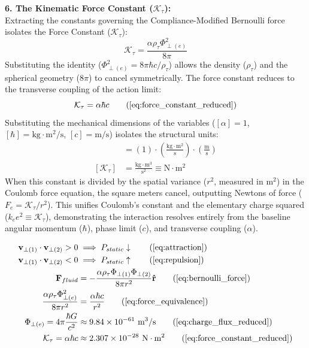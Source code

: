 \textbf{6. The Kinematic Force Constant ($\mathcal{K}_\tau$):} \\
Extracting the constants governing the Compliance-Modified Bernoulli force isolates the Force Constant ($\mathcal{K}_\tau$):
\begin{equation}
    \mathcal{K}_\tau = \frac{\alpha \rho_{\tau} \Phi_{\perp(e)}^2}{8\pi}
\end{equation}
Substituting the identity ($\Phi_{\perp(e)}^2 = 8\pi \hbar c / \rho_{\tau}$) allows the density ($\rho_{\tau}$) and the spherical geometry ($8\pi$) to cancel symmetrically. The force constant reduces to the transverse coupling of the action limit:
\begin{equation}
    \mathcal{K}_\tau = \alpha \hbar c \tag{\ref{eq:force_constant_reduced}}
\end{equation}
Substituting the mechanical dimensions of the variables ($[\alpha] = 1$, $[\hbar] = \text{kg}\cdot\text{m}^2/\text{s}$, $[c] = \text{m/s}$) isolates the structural units:
\begin{align}
    [\mathcal{K}_\tau] &= (1) \cdot \left(\frac{\text{kg}\cdot\text{m}^2}{\text{s}}\right) \cdot \left(\frac{\text{m}}{\text{s}}\right) \nonumber \\
    [\mathcal{K}_\tau] &= \frac{\text{kg}\cdot\text{m}^3}{\text{s}^2} \equiv \text{N}\cdot\text{m}^2
\end{align}
When this constant is divided by the spatial variance ($r^2$, measured in $\text{m}^2$) in the Coulomb force equation, the square meters cancel, outputting Newtons of force ($F_e = \mathcal{K}_\tau / r^2$). 
This unifies Coulomb's constant and the elementary charge squared ($k_e e^2 \equiv \mathcal{K}_\tau$), demonstrating the interaction resolves entirely from the baseline angular momentum ($\hbar$), phase limit ($c$), and transverse coupling ($\alpha$).

\begin{tcolorbox}[recallbox, title={\ref{box:coulomb_bernoulli}. Coulomb's Law (Spherical Bernoulli \& Phase Flux)}]
\begin{align}
    \mathbf{v}_{\perp(1)} \cdot \mathbf{v}_{\perp(2)} > 0 &\implies P_{static} \downarrow \tag{\ref{eq:attraction}} \\
    \mathbf{v}_{\perp(1)} \cdot \mathbf{v}_{\perp(2)} < 0 &\implies P_{static} \uparrow \tag{\ref{eq:repulsion}} \\
    \mathbf{F}_{fluid} &= - \frac{\alpha \rho_{\tau} \Phi_{\perp(1)} \Phi_{\perp(2)}}{8\pi r^2} \mathbf{\hat{r}} \tag{\ref{eq:bernoulli_force}} \\
    \frac{\alpha \rho_{\tau} \Phi_{\perp(e)}^2}{8\pi r^2} &= \frac{\alpha \hbar c}{r^2} \tag{\ref{eq:force_equivalence}} \\
    \Phi_{\perp(e)} = 4\pi \frac{\hbar G}{c^2} &\approx 9.84 \times 10^{-61} \text{ m}^3/\text{s} \tag{\ref{eq:charge_flux_reduced}} \\ %
    \mathcal{K}_\tau = \alpha \hbar c &\approx 2.307 \times 10^{-28} \text{ N}\cdot\text{m}^2 \tag{\ref{eq:force_constant_reduced}}
\end{align}
\end{tcolorbox}

